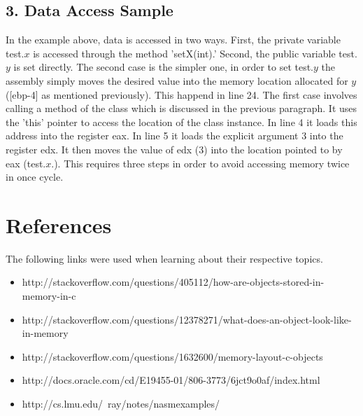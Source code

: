 \documentclass{article}
\begin{document}
\subsection*{3. Data Access Sample}
In the example above, data is accessed in two ways. First, the private variable test.$x$ is accessed through the method 'setX(int).' Second, the public variable test.$y$ is set directly. The second case is the simpler one, in order to set test.$y$ the assembly simply moves the desired value into the memory location allocated for $y$ ([ebp-4] as mentioned previously). This happend in line 24. The first case involves calling a method of the class which is discussed in the previous paragraph. It uses the 'this' pointer to access the location of the class instance. In line 4 it loads this address into the register eax. In line 5 it loads the explicit argument 3 into the register edx. It then moves the value of edx (3) into the location pointed to by eax (test.$x$.). This requires three steps in order to avoid accessing memory twice in once cycle.

\section*{References}
The following links were used when learning about their respective topics.
\begin{itemize}
    \item http://stackoverflow.com/questions/405112/how-are-objects-stored-in-memory-in-c
    \item http://stackoverflow.com/questions/12378271/what-does-an-object-look-like-in-memory
    \item http://stackoverflow.com/questions/1632600/memory-layout-c-objects
    \item http://docs.oracle.com/cd/E19455-01/806-3773/6jct9o0af/index.html
    \item http://cs.lmu.edu/~ray/notes/nasmexamples/
\end{itemize}
\end{document}
